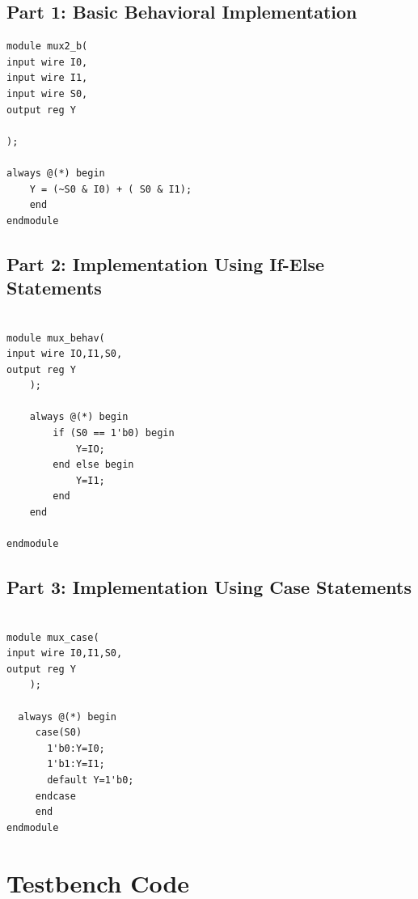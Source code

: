 \documentclass[12pt,a4paper]{report}
\begin{document}
\subsection{Part 1: Basic Behavioral Implementation}

\begin{verilogbox}
\begin{lstlisting}
module mux2_b(
input wire I0,
input wire I1,
input wire S0,
output reg Y

);

always @(*) begin
    Y = (~S0 & I0) + ( S0 & I1);
    end 
endmodule
\end{lstlisting}
\end{verilogbox}

\subsection{Part 2: Implementation Using If-Else Statements}

\begin{verilogbox}
\begin{lstlisting}

module mux_behav(
input wire IO,I1,S0,
output reg Y
    );
    
    always @(*) begin
        if (S0 == 1'b0) begin
            Y=IO;
        end else begin
            Y=I1;
        end 
    end
       
endmodule

\end{lstlisting}
\end{verilogbox}

\subsection{Part 3: Implementation Using Case Statements}

\begin{verilogbox}
\begin{lstlisting}

module mux_case(
input wire I0,I1,S0,
output reg Y
    );
    
  always @(*) begin
     case(S0)
       1'b0:Y=I0;
       1'b1:Y=I1;
       default Y=1'b0;
     endcase
     end
endmodule

\end{lstlisting}
\end{verilogbox}

\section{Testbench Code}
\end{document}
